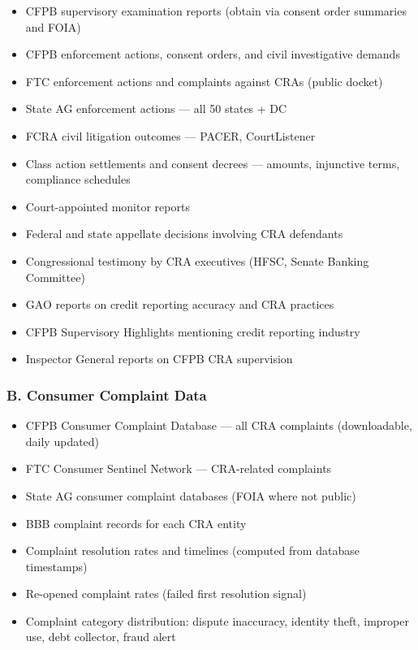 \documentclass[a4paper,11pt]{article}
\begin{document}
	\begin{itemize}[leftmargin=1.5em]
		\item CFPB supervisory examination reports (obtain via consent order summaries and FOIA)
		\item CFPB enforcement actions, consent orders, and civil investigative demands
		\item FTC enforcement actions and complaints against CRAs (public docket)
		\item State AG enforcement actions — all 50 states + DC
		\item FCRA civil litigation outcomes — PACER, CourtListener
		\item Class action settlements and consent decrees — amounts, injunctive terms, compliance schedules
		\item Court-appointed monitor reports
		\item Federal and state appellate decisions involving CRA defendants
		\item Congressional testimony by CRA executives (HFSC, Senate Banking Committee)
		\item GAO reports on credit reporting accuracy and CRA practices
		\item CFPB Supervisory Highlights mentioning credit reporting industry
		\item Inspector General reports on CFPB CRA supervision
	\end{itemize}
	
	\subsubsection{B. Consumer Complaint Data}
	
	\begin{itemize}[leftmargin=1.5em]
		\item CFPB Consumer Complaint Database — all CRA complaints (downloadable, daily updated)
		\item FTC Consumer Sentinel Network — CRA-related complaints
		\item State AG consumer complaint databases (FOIA where not public)
		\item BBB complaint records for each CRA entity
		\item Complaint resolution rates and timelines (computed from database timestamps)
		\item Re-opened complaint rates (failed first resolution signal)
		\item Complaint category distribution: dispute inaccuracy, identity theft, improper use, debt collector, fraud alert
	\end{itemize}
	
\end{document}
